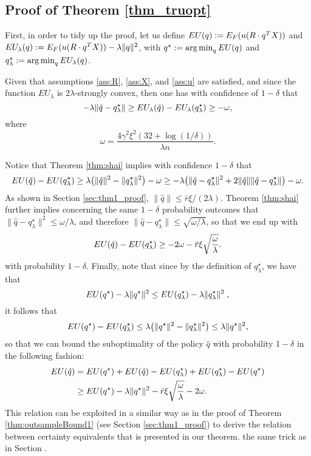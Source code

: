 \subsection{Proof of Theorem \ref{thm_truopt}}

First, in order to tidy up the proof, let us define $EU(q) := E_F(u(R\cdot q^T X))$ and $EU_\lambda(q) := E_F(u(R\cdot q^T X)) - \lambda\|q\|^2$,
with $q^\star := \operatorname*{arg\,min}_q EU(q)$ and $q^\star_\lambda := \operatorname*{arg\,min}_q EU_\lambda(q)$.

\begin{thm}\label{thm:shai}
  Given that assumptions \ref{ass:R}, \ref{ass:X}, and \ref{ass:u} are satisfied, and
  since the function $EU_\lambda$ is $2\lambda$-strongly convex, then one has with confidence of
  $1-\delta$ that
  \[
    -\lambda\|\hat q - q^\star_\lambda\| \geq EU_\lambda(\hat q) - EU_\lambda(q^\star_\lambda) \geq -\omega,
  \]
  where
  \[
    \omega = \frac{4\gamma^2\xi^2(32+\log(1/\delta))}{\lambda n}.
  \]
\end{thm}

Notice that Theorem \ref{thm:shai} implies with confidence $1-\delta$ that
\[
  EU(\hat q) - EU(q^\star_\lambda) \geq \lambda\bigl(\|\hat q\|^2 -
  \|q^\star_\lambda\|^2\bigr) -\omega
  \geq -\lambda\bigl(\|\hat q -
  q^\star_\lambda\|^2 +2\|\hat q\|\|\hat q - q^\star_\lambda\|\bigr) - \omega.
\]
As shown in Section \ref{sec:thm1_proof}, $\|\hat q\| \leq \bar r\xi/(2\lambda)$. Theorem \ref{thm:shai} further implies concerning the same $1-\delta$ probability outcomes that
$\|\hat q - q^\star_\lambda\|^2 \leq \omega/\lambda$, and therefore
$\|\hat q - q^\star_\lambda\| \leq \sqrt{\omega/\lambda}$, so that we end up with
\[
  EU(\hat q) - EU(q^\star_\lambda) \geq -2\omega - \bar r\xi\sqrt{\frac{\omega}{\lambda}}.
\]
with probability $1-\delta$. Finally, note that since by the  definition of $q^\star_\lambda$, we have that
\[
  EU(q^\star) - \lambda\|q^\star\|^2 \leq EU(q^\star_\lambda) - \lambda\|q^\star_\lambda\|^2\;,
\]
it follows that
\[
  EU(q^\star) - EU(q^\star_\lambda) \leq \lambda\bigl(\|q^\star\|^2 -
  \|q^\star_\lambda\|^2\bigr) \leq \lambda\|q^\star\|^2,
\]
so that we can bound the suboptimality of the policy $\hat q$ with probability $1-\delta$
in the following fashion:
\begin{align*}
  EU(\hat q) &= EU(q^\star) + EU(\hat q) - EU(q^\star_\lambda) + EU(q^\star_\lambda)
                - EU(q^\star)\\
              &\geq EU(q^\star) - \lambda\|q^\star\|^2 - \bar r\xi\sqrt{\frac{\omega}{\lambda}} - 2\omega.
\end{align*}
This relation can be exploited in a similar way as in the proof of Theorem \ref{thm:outsampleBound1} (see Section \ref{sec:thm1_proof}) to derive the relation between certainty equivalents that is presented in our theorem.
the same trick as in Section .

